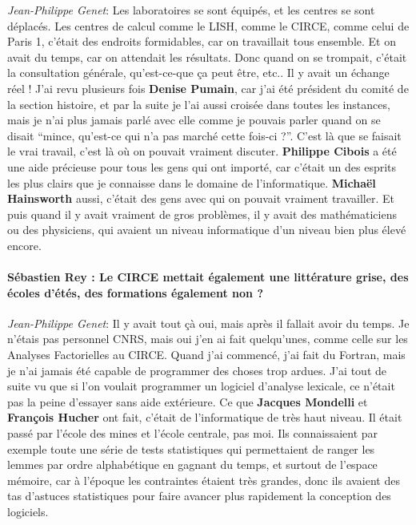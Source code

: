 \noindent\emph{Jean-Philippe Genet}: Les laboratoires se sont équipés, et les centres se sont déplacés. Les centres de calcul comme le LISH, comme le CIRCE, comme celui de Paris 1, c'était des endroits formidables, car on travaillait tous ensemble. Et on avait du temps, car on attendait les résultats. Donc quand on se trompait, c'était la consultation générale, qu'est-ce-que ça peut être, etc.. Il y avait un échange réel ! J'ai revu plusieurs fois \textbf{Denise Pumain}, car j'ai été président du comité de la section histoire, et par la suite je l'ai aussi croisée dans toutes les instances, mais je n'ai plus jamais parlé avec elle comme je pouvais parler quand on se disait \enquote{mince, qu'est-ce qui n'a pas marché cette fois-ci ?}. C'est là que se faisait le vrai travail, c'est là où on pouvait vraiment discuter. \textbf{Philippe Cibois} a été une aide précieuse pour tous les gens qui ont importé, car c'était un des esprits les plus clairs que je connaisse dans le domaine de l'informatique. \textbf{Michaël Hainsworth} aussi, c'était des gens avec qui on pouvait vraiment travailler. Et puis quand il y avait vraiment de gros problèmes, il y avait des mathématiciens ou des physiciens, qui avaient un niveau informatique d'un niveau bien plus élevé encore.

\paragraph*{Sébastien Rey : Le CIRCE mettait également une littérature grise, des écoles d'étés, des formations également non ? }

\noindent\emph{Jean-Philippe Genet}: Il y avait tout çà oui, mais après il fallait avoir du temps. Je n'étais pas personnel CNRS, mais oui j'en ai fait quelqu'unes, comme celle sur les Analyses Factorielles au CIRCE. Quand j'ai commencé, j'ai fait du Fortran, mais je n'ai jamais été capable de programmer des choses trop ardues. J'ai tout de suite vu que si l'on voulait programmer un logiciel d'analyse lexicale, ce n'était pas la peine d'essayer sans aide extérieure. Ce que \textbf{Jacques Mondelli} et \textbf{François Hucher} ont fait, c'était de l'informatique de très haut niveau. Il était passé par l'école des mines et l'école centrale, pas moi. Ils connaissaient par exemple toute une série de tests statistiques qui permettaient de ranger les lemmes par ordre alphabétique en gagnant du temps, et surtout de l'espace mémoire, car à l'époque les contraintes étaient très grandes, donc ils avaient des tas d'astuces statistiques pour faire avancer plus rapidement la conception des logiciels. 
 

